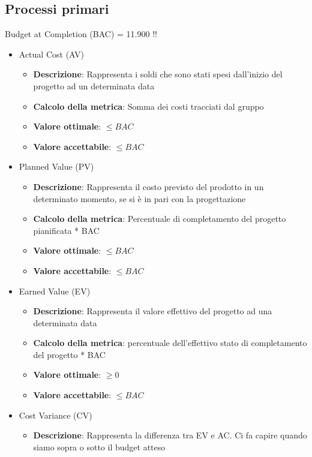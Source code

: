 \documentclass[12pt]{article}
\begin{document}
\subsection{Processi primari}
Budget at Completion (BAC) = 11.900 !!
\begin{itemize}
	\item Actual Cost (AV)
	      \begin{itemize}
		      \item \textbf{Descrizione}: Rappresenta i soldi che sono stati spesi dall'inizio del progetto ad un determinata data
		      \item \textbf{Calcolo della metrica}: Somma dei costi tracciati dal gruppo
		      \item \textbf{Valore ottimale}: $\le BAC$
		      \item \textbf{Valore accettabile}: $\le BAC$
	      \end{itemize}
	\item Planned Value (PV)
	      \begin{itemize}
		      \item \textbf{Descrizione}: Rappresenta il costo previsto del prodotto in un determinato momento, se si è in pari con la progettazione
		      \item \textbf{Calcolo della metrica}: Percentuale di completamento del progetto pianificata * BAC
		      \item \textbf{Valore ottimale}: $\le BAC$
		      \item \textbf{Valore accettabile}: $\le BAC$
	      \end{itemize}
	\item Earned Value (EV)
	      \begin{itemize}
		      \item \textbf{Descrizione}: Rappresenta il valore effettivo del progetto ad una determinata data
		      \item \textbf{Calcolo della metrica}: percentuale dell'effettivo stato di completamento del progetto * BAC
		      \item \textbf{Valore ottimale}: $\ge 0$
		      \item \textbf{Valore accettabile}: $\le BAC$
	      \end{itemize}
	\item Cost Variance (CV)
	      \begin{itemize}
		      \item \textbf{Descrizione}: Rappresenta la differenza tra EV e AC. Ci fa capire quando siamo sopra o sotto il budget atteso

\end{itemize}
\end{itemize}
\end{document}
